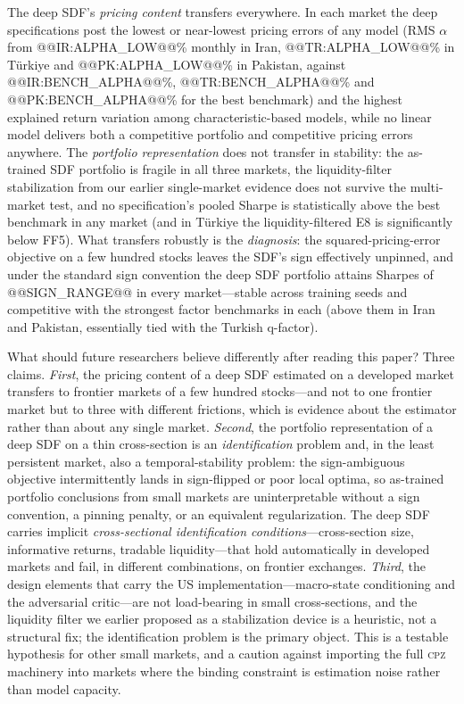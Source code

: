 \documentclass[12pt]{article}
\begin{document}
The deep SDF's \emph{pricing content} transfers everywhere. In each market the deep specifications post the lowest or near-lowest pricing errors of any model (RMS $\alpha$ from @@IR:ALPHA_LOW@@\% monthly in Iran, @@TR:ALPHA_LOW@@\% in T\"urkiye and @@PK:ALPHA_LOW@@\% in Pakistan, against @@IR:BENCH_ALPHA@@\%, @@TR:BENCH_ALPHA@@\% and @@PK:BENCH_ALPHA@@\% for the best benchmark) and the highest explained return variation among characteristic-based models, while no linear model delivers both a competitive portfolio and competitive pricing errors anywhere. The \emph{portfolio representation} does not transfer in stability: the as-trained SDF portfolio is fragile in all three markets, the liquidity-filter stabilization from our earlier single-market evidence does not survive the multi-market test, and no specification's pooled Sharpe is statistically above the best benchmark in any market (and in T\"urkiye the liquidity-filtered E8 is significantly below FF5). What transfers robustly is the \emph{diagnosis}: the squared-pricing-error objective on a few hundred stocks leaves the SDF's sign effectively unpinned, and under the standard sign convention the deep SDF portfolio attains Sharpes of @@SIGN_RANGE@@ in every market---stable across training seeds and competitive with the strongest factor benchmarks in each (above them in Iran and Pakistan, essentially tied with the Turkish q-factor).

What should future researchers believe differently after reading this paper? Three claims. \emph{First}, the pricing content of a deep SDF estimated on a developed market transfers to frontier markets of a few hundred stocks---and not to one frontier market but to three with different frictions, which is evidence about the estimator rather than about any single market. \emph{Second}, the portfolio representation of a deep SDF on a thin cross-section is an \emph{identification} problem and, in the least persistent market, also a temporal-stability problem: the sign-ambiguous objective intermittently lands in sign-flipped or poor local optima, so as-trained portfolio conclusions from small markets are uninterpretable without a sign convention, a pinning penalty, or an equivalent regularization. The deep SDF carries implicit \emph{cross-sectional identification conditions}---cross-section size, informative returns, tradable liquidity---that hold automatically in developed markets and fail, in different combinations, on frontier exchanges. \emph{Third}, the design elements that carry the US implementation---macro-state conditioning and the adversarial critic---are not load-bearing in small cross-sections, and the liquidity filter we earlier proposed as a stabilization device is a heuristic, not a structural fix; the identification problem is the primary object. This is a testable hypothesis for other small markets, and a caution against importing the full \textsc{cpz} machinery into markets where the binding constraint is estimation noise rather than model capacity.
\end{document}

